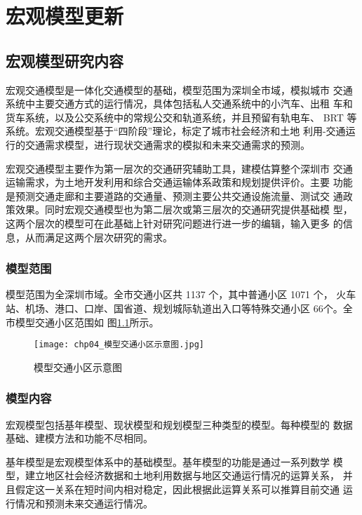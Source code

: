 

\chapter{宏观模型更新}

\section{宏观模型研究内容}
宏观交通模型是一体化交通模型的基础，模型范围为深圳全市域，模拟城市
交通系统中主要交通方式的运行情况，具体包括私人交通系统中的小汽车、出租
车和货车系统，以及公交系统中的常规公交和轨道系统，并且预留有轨电车、
BRT 等系统。宏观交通模型基于“四阶段”理论，标定了城市社会经济和土地
利用-交通运行的交通需求模型，进行现状交通需求的模拟和未来交通需求的预测。

宏观交通模型主要作为第一层次的交通研究辅助工具，建模估算整个深圳市
交通运输需求，为土地开发利用和综合交通运输体系政策和规划提供评价。主要
功能是预测交通走廊和主要道路的交通量、预测主要公共交通设施流量、测试交
通政策效果。同时宏观交通模型也为第二层次或第三层次的交通研究提供基础模
型，这两个层次的模型可在此基础上针对研究问题进行进一步的编辑，输入更多
的信息，从而满足这两个层次研究的需求。

\subsection{模型范围}
模型范围为全深圳市域。全市交通小区共 1137 个，其中普通小区 1071 个，
火车站、机场、港口、口岸、国省道、规划城际轨道出入口等特殊交通小区 66个。全市模型交通小区范围如
图\ref{fig:模型交通小区示意图}所示。

\begin{figure}[!ht]
  \centering
  \texttt{[image: chp04\_模型交通小区示意图.jpg]}
  \caption{模型交通小区示意图\label{fig:模型交通小区示意图} }
\end{figure}

\subsection{模型内容}
宏观模型包括基年模型、现状模型和规划模型三种类型的模型。每种模型的
数据基础、建模方法和功能不尽相同。

基年模型是宏观模型体系中的基础模型。基年模型的功能是通过一系列数学
模型，建立地区社会经济数据和土地利用数据与地区交通运行情况的运算关系，
并且假定这一关系在短时间内相对稳定，因此根据此运算关系可以推算目前交通
运行情况和预测未来交通运行情况。


